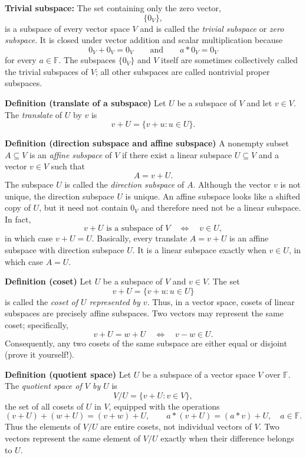 \documentclass[a4paper,11pt,abstract=true]{scrartcl}
\theoremstyle{dotlessP}
\theoremstyle{dotlessS}
\theoremstyle{remark}
\theoremstyle{definition}
\begin{document}
\begin{example_box}
\textbf{Trivial subspace:} The set containing only the zero
vector,
\[
\{0_V\},
\]
is a subspace of every vector space $V$ and is called the \emph{trivial
subspace} or \emph{zero subspace}. It is closed under vector addition and
scalar multiplication because
\[
0_V+0_V=0_V
\qquad\text{and}\qquad
a*0_V=0_V
\]
for every $a\in \mathbb{F}$. The subspaces $\{0_V\}$ and $V$ itself are sometimes
collectively called the trivial subspaces of $V$; all other subspaces are
called nontrivial proper subspaces.
\end{example_box}

\begin{definition_box}
\textbf{Definition (translate of a subspace)} Let $U$ be a subspace of $V$
and let $v\in V$. The \emph{translate} of $U$ by $v$ is
\[
v+U=\{v+u:u\in U\}.
\]
\end{definition_box}

\textbf{Definition (direction subspace and affine subspace)} A nonempty subset $A\subseteq V$ is an
\emph{affine subspace} of $V$ if there exist a linear subspace $U\subseteq V$
and a vector $v\in V$ such that
\[
A=v+U.
\]
The subspace $U$ is called the \emph{direction subspace} of $A$. Although the
vector $v$ is not unique, the direction subspace $U$ is unique. An affine
subspace looks like a shifted copy of $U$, but it need not contain $0_V$ and
therefore need not be a linear subspace. In fact,
\[
v+U\text{ is a subspace of }V
\quad\Longleftrightarrow\quad
v\in U,
\]
in which case $v+U=U$. Basically, 
every translate $A=v+U$ is an affine subspace with direction subspace $U$.  It is a linear
subspace exactly when $v\in U$, in which case $A=U$.

\textbf{Definition (coset)} Let $U$ be a subspace of $V$ and $v\in V$. The
set
\[
v+U=\{v+u:u\in U\}
\]
is called the \emph{coset of $U$ represented by $v$}. Thus, in a vector
space, cosets of linear subspaces are precisely affine subspaces. Two vectors
may represent the same coset; specifically,
\[
v+U=w+U
\quad\Longleftrightarrow\quad
v-w\in U.
\]
Consequently, any two cosets of the same subspace are either equal or
disjoint (prove it yourself!).

\textbf{Definition (quotient space)} Let $U$ be a subspace of a vector
space $V$ over $\mathbb{F}$. The \emph{quotient space of $V$ by $U$} is
\[
V/U=\{v+U:v\in V\},
\]
the set of all cosets of $U$ in $V$, equipped with the operations
\[
(v+U)+(w+U)=(v+w)+U,
\qquad
a*(v+U)=(a*v)+U,\quad a\in\mathbb{F}.
\]
Thus the elements of $V/U$ are entire cosets, not individual vectors of $V$.
Two vectors represent the same element of $V/U$ exactly when their
difference belongs to $U$.
\end{document}
